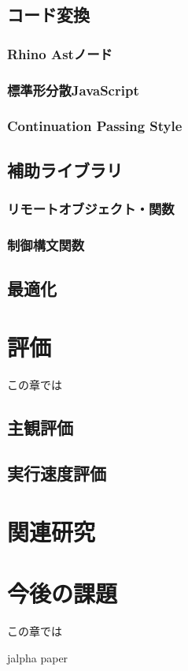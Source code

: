 \documentclass[a4j,12pt]{jreport}
\begin{document}
\section{コード変換}
\subsection{Rhino Astノード}
\subsection{標準形分散JavaScript}
\subsection{Continuation Passing Style}
\section{補助ライブラリ}
\subsection{リモートオブジェクト・関数}
\subsection{制御構文関数}
\section{最適化}

\chapter{評価}
この章では
\section{主観評価}
\section{実行速度評価}


\chapter{関連研究}


\chapter{今後の課題}
この章では


 {jalpha}
 {paper}
\end{document}
